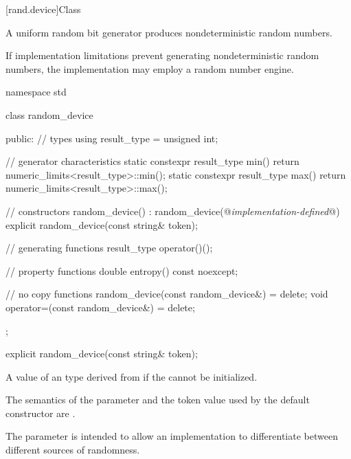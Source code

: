 [rand.device]{Class }%
%

\pnum
A 
uniform random bit generator
produces nondeterministic random numbers.

\pnum
If implementation limitations
prevent generating nondeterministic random numbers,
the implementation may employ a random number engine.

%
%
\begin{codeblock}
namespace std {
  class random_device {
  public:
    // types
    using result_type = unsigned int;

    // generator characteristics
    static constexpr result_type min() { return numeric_limits<result_type>::min(); }
    static constexpr result_type max() { return numeric_limits<result_type>::max(); }

    // constructors
    random_device() : random_device(@\textit{implementation-defined}@) {}
    explicit random_device(const string& token);

    // generating functions
    result_type operator()();

    // property functions
    double entropy() const noexcept;

    // no copy functions
    random_device(const random_device&) = delete;
    void operator=(const random_device&) = delete;
  };
}
\end{codeblock}


%
\begin{itemdecl}
explicit random_device(const string& token);
\end{itemdecl}

\begin{itemdescr}
\pnum
\throws
A value of an  type
 derived from 
 if the  cannot be initialized.

\pnum
\remarks
 The semantics of the  parameter
 and the token value used by the default constructor are
 .
\begin{footnote}
The parameter is intended
   to allow an implementation to differentiate
   between different sources of randomness.
\end{footnote}
\end{itemdescr}

